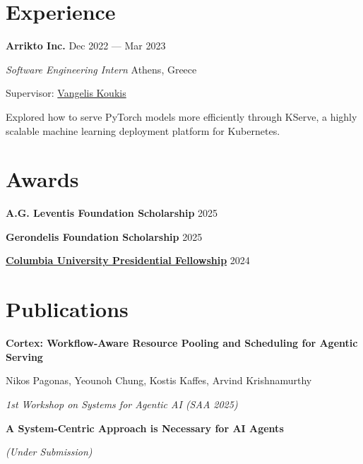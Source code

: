 \documentclass[margin,12pt]{resume}
\newcommand{\cvName}{Nikos Pagonas}
\newcommand{\descriptionVSpace}{\vspace{0.5ex}\xspace}
\newcommand{\subsectionVSpace}{\vspace{3.5ex}\xspace}
\newcommand{\sectionVSpace}{\vspace{1ex}\xspace} %
\newcommand{\sectionVSpaceCorrection}{\vspace{-3.5ex}} %
\newcommand{\header}[1]{\textbf{#1}\xspace}
\newcommand{\authors}[1]{#1\xspace}
\newcommand{\company}[1]{\header{#1}\xspace}
\newcommand{\equalContributionNote}{(*equal contribution)\xspace}
\newcommand{\fellowship}[1]{\header{#1}\xspace}
\newcommand{\interval}[2]{#1 --- #2\xspace}
\newcommand{\me}{\cvName\xspace}
\newcommand{\paperTitle}[1]{\header{#1}\xspace}
\newcommand{\place}[1]{#1\xspace}
\newcommand{\role}[1]{\textit{#1}\xspace}
\newcommand{\stitle}[1]{#1:\xspace}
\newcommand{\underSubmission}{\textit{(Under Submission)}\xspace}
\newcommand{\venue}[1]{\textit{#1}\xspace}
\newenvironment{rSubsection}{}{\par\subsectionVSpace}
\newenvironment{rSection}[1]{\sectionVSpaceCorrection\section{#1}\xspace}{\sectionVSpace\par}
\newenvironment{jobDuties}{\descriptionVSpace}{\par}
\begin{document}
\begin{resume}
\begin{rSection}{Experience}
		\begin{rSubsection}
			\company{Arrikto Inc.} \hfill \interval{Dec 2022}{Mar 2023}

			\role{Software Engineering Intern} \hfill \place{Athens, Greece}

			\stitle{Supervisor} \href{https://www.linkedin.com/in/vkoukis/}{Vangelis Koukis}

			\begin{jobDuties}
				Explored how to serve PyTorch models more efficiently through KServe, a highly scalable machine learning deployment platform for Kubernetes.
			\end{jobDuties}
		\end{rSubsection}
	\end{rSection}


	\begin{rSection}{Awards}
		\begin{rSubsection}
			\fellowship{A.G. Leventis Foundation Scholarship} \hfill 2025
		\end{rSubsection}

		\begin{rSubsection}
			\fellowship{Gerondelis Foundation Scholarship} \hfill 2025
		\end{rSubsection}

		\begin{rSubsection}
			\fellowship{\href{https://www.cs.columbia.edu/2024/meet-the-scholars-phd-students-with-prestigious-fellowships/}{Columbia University Presidential Fellowship}} \hfill 2024
		\end{rSubsection}
	\end{rSection}

	\begin{rSection}{Publications}
		\begin{rSubsection}
			\paperTitle{Cortex: Workflow-Aware Resource Pooling and Scheduling for Agentic Serving}

			\authors{\me, Yeounoh Chung, Kostis Kaffes, Arvind Krishnamurthy}

			\venue{1st Workshop on Systems for Agentic AI (SAA 2025)}
		\end{rSubsection}

		\begin{rSubsection}
			\paperTitle{A System-Centric Approach is Necessary for AI Agents}

			\underSubmission



\end{rSubsection}
\end{rSection}
\end{resume}
\end{document}
